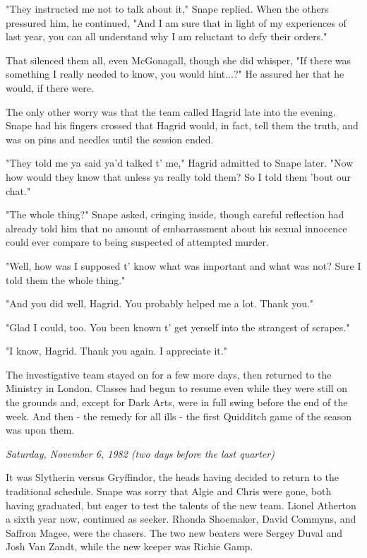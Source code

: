 \documentclass[a4paper,11pt]{article}
\begin{document}
"They instructed me not to talk about it," Snape replied. When the others pressured him, he continued, "And I am sure that in light of my experiences of last year, you can all understand why I am reluctant to defy their orders."

That silenced them all, even McGonagall, though she did whisper, "If there was something I really needed to know, you would hint...?" He assured her that he would, if there were.

The only other worry was that the team called Hagrid late into the evening. Snape had his fingers crossed that Hagrid would, in fact, tell them the truth, and was on pins and needles until the session ended.

"They told me ya said ya'd talked t' me," Hagrid admitted to Snape later. "Now how would they know that unless ya really told them? So I told them 'bout our chat."

"The whole thing?" Snape asked, cringing inside, though careful reflection had already told him that no amount of embarrassment about his sexual innocence could ever compare to being suspected of attempted murder.

"Well, how was I supposed t' know what was important and what was not? Sure I told them the whole thing."

"And you did well, Hagrid. You probably helped me a lot. Thank you."

"Glad I could, too. You been known t' get yerself into the strangest of scrapes."

"I know, Hagrid. Thank you again. I appreciate it."

The investigative team stayed on for a few more days, then returned to the Ministry in London. Classes had begun to resume even while they were still on the grounds and, except for Dark Arts, were in full swing before the end of the week. And then - the remedy for all ills - the first Quidditch game of the season was upon them.

\emph{Saturday, November 6, 1982 (two days before the last quarter)}

It was Slytherin versus Gryffindor, the heads having decided to return to the traditional schedule. Snape was sorry that Algie and Chris were gone, both having graduated, but eager to test the talents of the new team. Lionel Atherton a sixth year now, continued as seeker. Rhonda Shoemaker, David Commyns, and Saffron Magee, were the chasers. The two new beaters were Sergey Duval and Josh Van Zandt, while the new keeper was Richie Gamp.
\end{document}
